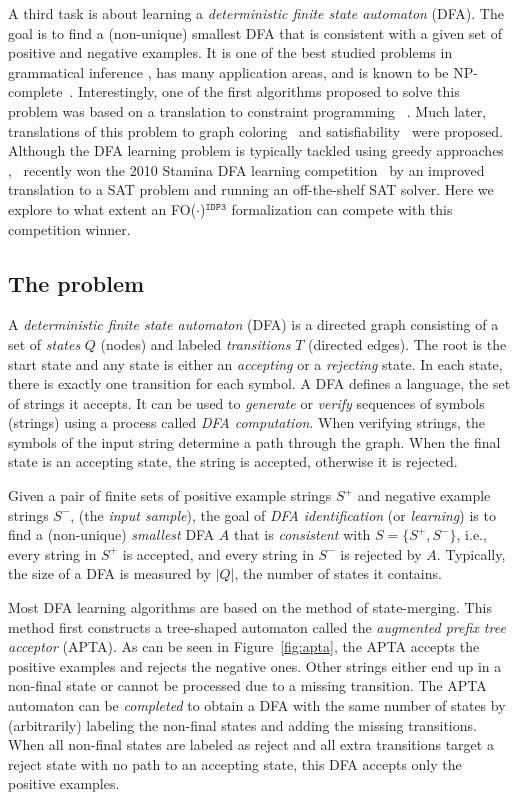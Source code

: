 \documentclass{tlp}
\newcommand{\fodotidp}{{\sc FO($\cdot$)$^{\mathtt{IDP3}}$}\xspace}
\renewcommand{\|}{\ensuremath{\,|\,}}
\renewcommand{\|}{\,|\,}
\begin{document}
A third task is about learning a {\em deterministic finite state
  automaton} (DFA). The goal is to find a (non-unique) smallest DFA
that is consistent with a given set of positive and negative
examples. It is one of the best studied problems in grammatical
inference \cite{pr/Higuera05}, has many application areas, and is
known to be NP-complete~\cite{iandc/Gold78}.
% 
Interestingly, one of the first algorithms proposed to solve this
problem was based on a translation to constraint programming
~\cite{biermannfeldman72}. Much later, translations of this problem to
graph coloring~\cite{CosteN97,costaverwer12} and
satisfiability~\cite{grinchtein06,Verwer} were
proposed. Although the DFA learning problem is typically tackled using
greedy approaches \cite{pr/Higuera05},~ recently won the
2010 Stamina DFA learning competition~\cite{stamina} by an improved
translation to a SAT problem and running an off-the-shelf SAT
solver. Here we explore to what extent an \fodotidp formalization can
compete with this competition winner.

\subsection{The problem}

A \emph{deterministic finite state automaton} (DFA) is a directed
graph consisting of a set of \emph{states} $Q$ (nodes) and labeled
\emph{transitions} $T$ (directed edges). The root is the start state
and any state is either an \emph{accepting} or a \emph{rejecting}
state. In each state, there is exactly one transition for each
symbol. A DFA defines a language, the set of strings it accepts. It
can be used to \emph{generate} or \emph{verify}
sequences of symbols (strings) using a process called \emph{DFA
  computation}. When verifying strings, the symbols of the input string
determine a path through the graph. When the final state is an
accepting state, the string is accepted, otherwise it is rejected.

Given a pair of finite sets of positive example strings $S^{+}$ and
negative example strings $S^{-}$, (the \emph{input sample}), the goal
of \emph{DFA identification} (or \emph{learning}) is to find a
(non-unique) \emph{smallest} DFA $\mathit{A}$ that is
\emph{consistent} with $S = \{S^+, S^-\}$, i.e., every string in $S^+$
is accepted, and every string in $S^-$ is rejected by
$\mathit{A}$. Typically, the size of a DFA is measured by $|Q|$, the
number of states it contains.

Most DFA learning algorithms are based on the method of state-merging.
This method first constructs a tree-shaped automaton called the
\emph{augmented prefix tree acceptor} (APTA).  As can be seen in
Figure~\ref{fig:apta}, the APTA accepts the positive examples and
rejects the negative ones. Other strings either end up in a non-final
state or cannot be processed due to a missing transition. 
The APTA automaton can be \emph{completed} to obtain a DFA with the same
number of states by (arbitrarily) labeling the non-final states and
adding the missing transitions. When all non-final states are labeled as
reject and all extra transitions target a reject state with no path to 
an accepting state, this DFA accepts only the positive examples.
\end{document}
